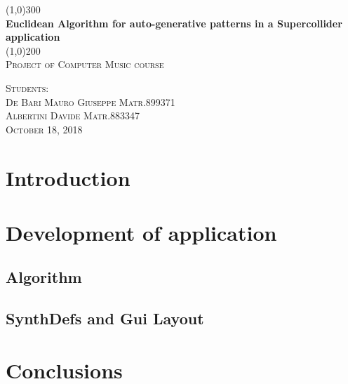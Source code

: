 \documentclass{report}
\begin{document}
\begin{titlepage}
	\begin{center}
	\line(1,0){300}\\
	[0.25in]
	\huge{\bfseries Euclidean Algorithm for auto-generative patterns in a Supercollider application}\\
	[2mm]
	\line(1,0){200}\\
	[1.5cm]
	\textsc{\LARGE Project of Computer Music course}\\
	[10.75cm]
	\end{center}
	\begin{flushright}
	\textsc{\large  Students:\\
	De Bari Mauro Giuseppe Matr.899371 \\
	Albertini Davide Matr.883347\\
	October 18, 2018 \\}
	\end{flushright}
\end{titlepage}

\tableofcontents
\newpage

\section{Introduction}


\section{Development of application}

\subsection{Algorithm}

\subsection{SynthDefs and Gui Layout}

\section{Conclusions}

\end{document}

